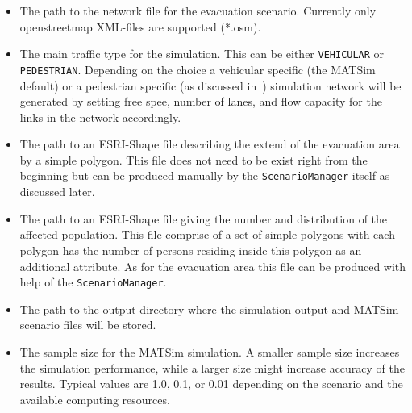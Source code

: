 \begin{itemize}
\item The path to the network file for the evacuation scenario. Currently only openstreetmap XML-files are supported (*.osm).
\item The main traffic type for the simulation. This can be either \verb+VEHICULAR+ or \verb+PEDESTRIAN+. Depending on the choice a vehicular specific (the MATSim default) or a pedestrian specific (as discussed in~\citet{LaemmelKluepfelNagel2009EvacPadangAtBookTimmermanns,Laemmel2011Diss}) simulation network will be generated by setting free spee, number of lanes, and flow capacity for the links in the network accordingly.
\item The path to an ESRI-Shape file describing the extend of the evacuation area by a simple polygon. This file does not need to be exist right from the beginning but can be produced manually by the \verb+ScenarioManager+ itself as discussed later.
\item The path to an ESRI-Shape file giving the number and distribution of the affected population. This file comprise of a set of simple polygons with each polygon has the number of persons residing inside this polygon as an additional attribute. As for the evacuation area this file can be produced with help of the  \verb+ScenarioManager+.
\item The path to the output directory where the simulation output and MATSim scenario files will be stored.
\item The sample size for the MATSim simulation. A smaller sample size increases the simulation performance, while a larger size might increase accuracy of the results. Typical values are 1.0, 0.1, or 0.01 depending on the scenario and the available computing resources.

\end{itemize}
